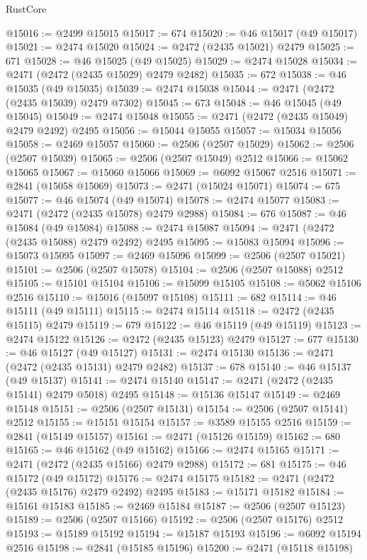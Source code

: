 \begin{lexlean}{RustCore}
\begin{coremodule}
@15016 := @2499 @15015
@15017 := 674
@15020 := @46 @15017 (@49 @15017)
@15021 := @2474 @15020
@15024 := @2472 (@2435 @15021) @2479
@15025 := 671
@15028 := @46 @15025 (@49 @15025)
@15029 := @2474 @15028
@15034 := @2471 (@2472 (@2435 @15029) @2479 @2482)
@15035 := 672
@15038 := @46 @15035 (@49 @15035)
@15039 := @2474 @15038
@15044 := @2471 (@2472 (@2435 @15039) @2479 @7302)
@15045 := 673
@15048 := @46 @15045 (@49 @15045)
@15049 := @2474 @15048
@15055 := @2471 (@2472 (@2435 @15049) @2479 @2492) @2495
@15056 := @15044 @15055
@15057 := @15034 @15056
@15058 := @2469 @15057
@15060 := @2506 (@2507 @15029)
@15062 := @2506 (@2507 @15039)
@15065 := @2506 (@2507 @15049) @2512
@15066 := @15062 @15065
@15067 := @15060 @15066
@15069 := @6092 @15067 @2516
@15071 := @2841 (@15058 @15069)
@15073 := @2471 (@15024 @15071)
@15074 := 675
@15077 := @46 @15074 (@49 @15074)
@15078 := @2474 @15077
@15083 := @2471 (@2472 (@2435 @15078) @2479 @2988)
@15084 := 676
@15087 := @46 @15084 (@49 @15084)
@15088 := @2474 @15087
@15094 := @2471 (@2472 (@2435 @15088) @2479 @2492) @2495
@15095 := @15083 @15094
@15096 := @15073 @15095
@15097 := @2469 @15096
@15099 := @2506 (@2507 @15021)
@15101 := @2506 (@2507 @15078)
@15104 := @2506 (@2507 @15088) @2512
@15105 := @15101 @15104
@15106 := @15099 @15105
@15108 := @5062 @15106 @2516
@15110 := @15016 (@15097 @15108)
@15111 := 682
@15114 := @46 @15111 (@49 @15111)
@15115 := @2474 @15114
@15118 := @2472 (@2435 @15115) @2479
@15119 := 679
@15122 := @46 @15119 (@49 @15119)
@15123 := @2474 @15122
@15126 := @2472 (@2435 @15123) @2479
@15127 := 677
@15130 := @46 @15127 (@49 @15127)
@15131 := @2474 @15130
@15136 := @2471 (@2472 (@2435 @15131) @2479 @2482)
@15137 := 678
@15140 := @46 @15137 (@49 @15137)
@15141 := @2474 @15140
@15147 := @2471 (@2472 (@2435 @15141) @2479 @5018) @2495
@15148 := @15136 @15147
@15149 := @2469 @15148
@15151 := @2506 (@2507 @15131)
@15154 := @2506 (@2507 @15141) @2512
@15155 := @15151 @15154
@15157 := @3589 @15155 @2516
@15159 := @2841 (@15149 @15157)
@15161 := @2471 (@15126 @15159)
@15162 := 680
@15165 := @46 @15162 (@49 @15162)
@15166 := @2474 @15165
@15171 := @2471 (@2472 (@2435 @15166) @2479 @2988)
@15172 := 681
@15175 := @46 @15172 (@49 @15172)
@15176 := @2474 @15175
@15182 := @2471 (@2472 (@2435 @15176) @2479 @2492) @2495
@15183 := @15171 @15182
@15184 := @15161 @15183
@15185 := @2469 @15184
@15187 := @2506 (@2507 @15123)
@15189 := @2506 (@2507 @15166)
@15192 := @2506 (@2507 @15176) @2512
@15193 := @15189 @15192
@15194 := @15187 @15193
@15196 := @6092 @15194 @2516
@15198 := @2841 (@15185 @15196)
@15200 := @2471 (@15118 @15198)

\end{coremodule}
\end{lexlean}
